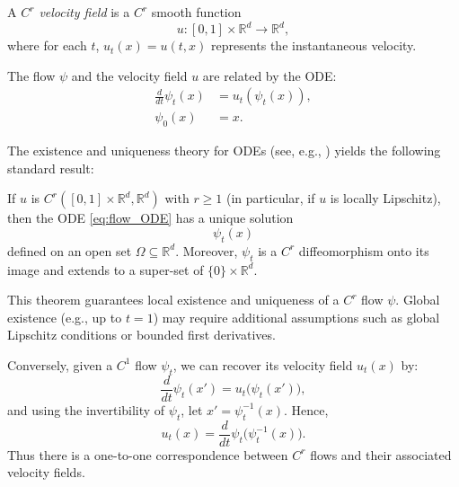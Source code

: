 \documentclass[12pt,a4paper]{article}
\begin{document}
\begin{definition}\label{def:Cr_velocity_field}
A \emph{\( C^r \) velocity field} is a \( C^r \) smooth function
\[
u : [0,1] \times \mathbb{R}^d \to \mathbb{R}^d,
\]
where for each \( t \), \( u_t(x) = u(t,x) \) represents the instantaneous velocity.
\end{definition}

The flow \( \psi \) and the velocity field \( u \) are related by the ODE:
\begin{subequations}\label{eq:flow_ODE}
\begin{align}
\frac{d}{dt} \psi_t(x) &= u_t(\psi_t(x)), \\
\psi_0(x) &= x.
\end{align}
\end{subequations}

The existence and uniqueness theory for ODEs (see, e.g., \cite{Perko2013,Coddington1955}) yields the following standard result:

\begin{theorem}\label{thm:local_existence_uniqueness}
If \(u\) is \(C^r([0,1] \times \mathbb{R}^d,\mathbb{R}^d)\) with \(r \ge 1\) (in particular, if \(u\) is locally Lipschitz), then the ODE \eqref{eq:flow_ODE} has a unique solution
\[
\psi_t(x)
\]
defined on an open set \(\Omega \subseteq \mathbb{R}^d\). Moreover, \(\psi_t\) is a \(C^r\) diffeomorphism onto its image and extends to a super-set of \(\{0\}\times\mathbb{R}^d\).
\end{theorem}

This theorem guarantees local existence and uniqueness of a \(C^r\) flow \(\psi\). Global existence (e.g., up to \(t=1\)) may require additional assumptions such as global Lipschitz conditions or bounded first derivatives.

Conversely, given a \(C^1\) flow \(\psi_t\), we can recover its velocity field \(u_t(x)\) by:
\[
\frac{d}{dt}\psi_t(x') = u_t\bigl(\psi_t(x')\bigr),
\]
and using the invertibility of \(\psi_t\), let \(x' = \psi_t^{-1}(x)\). Hence,
\[
u_t(x) = \frac{d}{dt}\psi_t\bigl(\psi_t^{-1}(x)\bigr).
\]
Thus there is a one-to-one correspondence between \(C^r\) flows and their associated velocity fields.

\bigskip



\end{document}
